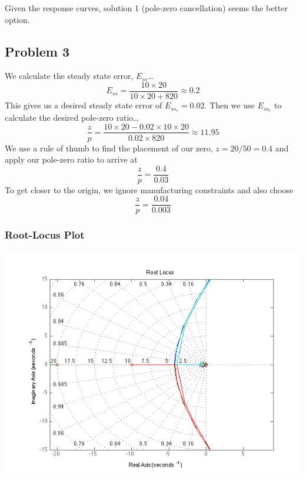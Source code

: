 \documentclass[letterpaper,10pt]{article}
\begin{document}
\begin{center}
\end{center}

Given the response curves, solution 1 (pole-zero cancellation) seems the better option.

\subsection*{Problem 3}
We calculate the steady state error, $E_{ss}$\dots
\[E_{ss} = \dfrac{10\times 20}{10\times 20+820}\approx 0.2\]
This gives us a desired steady state error of $E_{ss_{c}} = 0.02$.  Then we use $E_{ss_{c}}$ to calculate the desired pole-zero ratio\dots
\[\dfrac{z}{p} = \dfrac{10\times 20 - 0.02\times 10\times 20}{0.02\times 820}\approx 11.95\]
We use a rule of thumb to find the placement of our zero, $z = 20/50 = 0.4$ and apply our pole-zero ratio to arrive at
\[\dfrac{z}{p} = \dfrac{0.4}{0.03}\]
To get closer to the origin, we ignore manufacturing constraints and also choose
\[\dfrac{z}{p} = \dfrac{0.04}{0.003}\]

\subsubsection*{Root-Locus Plot}
\begin{center}
	\includegraphics[scale=0.75]{3-rlocus.png}
\end{center}
\end{document}
